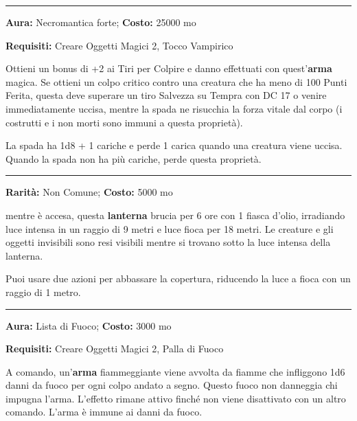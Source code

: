 \begin{multicols}{2}
\smallskip\noindent\rule{\linewidth}{2pt}  \hypertarget{LadradelleNoveVite}{}\smallskip{}\noindent\label{LadradelleNoveVite}

\textbf{Aura:} Necromantica forte; \textbf{Costo:} 25000 mo

\textbf{Requisiti:} Creare Oggetti Magici 2, Tocco Vampirico

Ottieni un bonus di +2 ai Tiri per Colpire e danno effettuati con quest'\textbf{arma} magica. Se ottieni un colpo critico contro una creatura che ha meno di 100 Punti Ferita, questa deve superare un tiro Salvezza su Tempra con DC 17 o venire immediatamente uccisa, mentre la spada ne risucchia la forza vitale dal corpo (i costrutti e i non morti sono immuni a questa proprietà).

La spada ha 1d8 + 1 cariche e perde 1 carica quando una creatura viene uccisa. Quando la spada non ha più cariche, perde questa proprietà.

\smallskip\noindent\rule{\linewidth}{2pt}  \hypertarget{LanternadellaRivelazione}{}\smallskip{}\noindent\label{LanternadellaRivelazione}

\textbf{Rarità:} Non Comune; \textbf{Costo:} 5000 mo

mentre è accesa, questa \textbf{lanterna} brucia per 6 ore con 1 fiasca d'olio, irradiando luce intensa in un raggio di 9 metri e luce fioca per 18 metri. Le creature e gli oggetti invisibili sono resi visibili mentre si trovano sotto la luce intensa della lanterna.

Puoi usare due azioni per abbassare la copertura, riducendo la luce a fioca con un raggio di 1 metro.

\smallskip\noindent\rule{\linewidth}{2pt}  \hypertarget{Linguadifuoco}{}\smallskip{}\noindent\label{Linguadifuoco}

\textbf{Aura:} Lista di Fuoco; \textbf{Costo:} 3000 mo

\textbf{Requisiti:} Creare Oggetti Magici 2, Palla di Fuoco

A comando, un'\textbf{arma} fiammeggiante viene avvolta da fiamme che infliggono 1d6 danni da fuoco per ogni colpo andato a segno. Questo fuoco non danneggia chi impugna l'arma. L'effetto rimane attivo finché non viene disattivato con un altro comando. L'arma è immune ai danni da fuoco.


\end{multicols}
